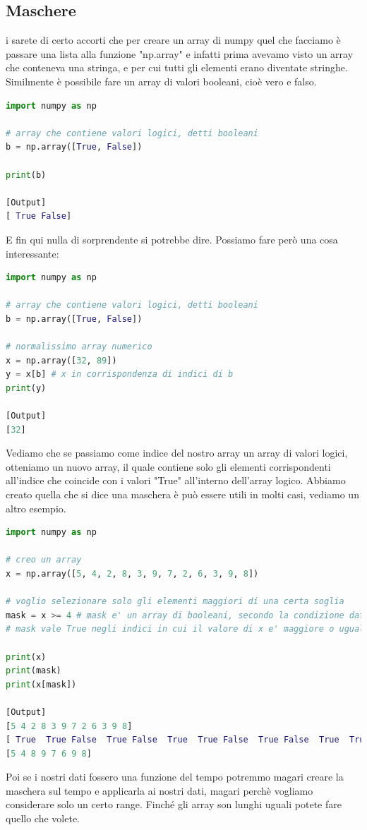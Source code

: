 \documentclass[10pt,a4paper]{article}
\begin{document}
\subsection{Maschere}
i sarete di certo accorti che per creare un array di numpy quel che facciamo è passare una lista alla funzione "np.array" e infatti prima avevamo visto un array che conteneva una stringa, e per cui tutti gli elementi erano diventate stringhe. Similmente è possibile fare un array di valori booleani, cioè vero e falso.
\begin{lstlisting}[language=Python]
import numpy as np

# array che contiene valori logici, detti booleani
b = np.array([True, False])

print(b)  

[Output]
[ True False] 
\end{lstlisting}
E fin qui nulla di sorprendente si potrebbe dire. Possiamo fare però una cosa interessante:
\begin{lstlisting}[language=Python]
import numpy as np

# array che contiene valori logici, detti booleani
b = np.array([True, False])

# normalissimo array numerico
x = np.array([32, 89])
y = x[b] # x in corrispondenza di indici di b
print(y)

[Output]
[32]
\end{lstlisting}
Vediamo che se passiamo come indice del nostro array un array di valori logici, otteniamo un nuovo array, il quale contiene solo gli elementi corrispondenti all'indice che coincide con i valori "True" all'interno dell'array logico. Abbiamo creato quella che si dice una maschera è può essere utili in molti casi, vediamo un altro esempio.
\begin{lstlisting}[language=Python]
import numpy as np

# creo un array
x = np.array([5, 4, 2, 8, 3, 9, 7, 2, 6, 3, 9, 8])

# voglio selezionare solo gli elementi maggiori di una certa soglia
mask = x >= 4 # mask e' un array di booleani, secondo la condizione data
# mask vale True negli indici in cui il valore di x e' maggiore o uguale a 4

print(x)
print(mask)
print(x[mask])

[Output]
[5 4 2 8 3 9 7 2 6 3 9 8]
[ True  True False  True False  True  True False  True False  True  True]
[5 4 8 9 7 6 9 8]
\end{lstlisting}
Poi se i nostri dati fossero una funzione del tempo potremmo magari creare la maschera sul tempo e applicarla ai nostri dati, magari perchè vogliamo considerare solo un certo range. Finché gli array son lunghi uguali potete fare quello che volete. 
\end{document}
